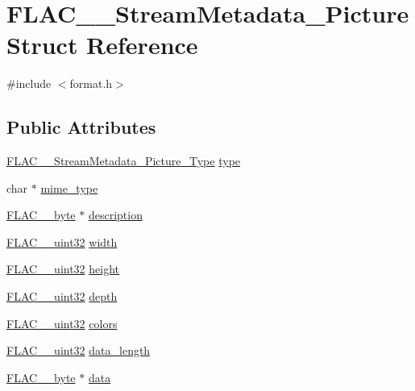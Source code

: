 \hypertarget{struct_f_l_a_c_____stream_metadata___picture}{}\section{F\+L\+A\+C\+\_\+\+\_\+\+Stream\+Metadata\+\_\+\+Picture Struct Reference}
\label{struct_f_l_a_c_____stream_metadata___picture}


{\ttfamily \#include $<$format.\+h$>$}

\subsection*{Public Attributes}
\begin{DoxyCompactItemize}
\item 
\hyperlink{group__flac__format_gaf6d3e836cee023e0b8d897f1fdc9825d}{F\+L\+A\+C\+\_\+\+\_\+\+Stream\+Metadata\+\_\+\+Picture\+\_\+\+Type} \hyperlink{struct_f_l_a_c_____stream_metadata___picture_addc05a87a1da1ec7dd2301944ff2819c}{type}
\item 
char $\ast$ \hyperlink{struct_f_l_a_c_____stream_metadata___picture_a9b4af2e10b627c0e79abf4cdd79f80e0}{mime\+\_\+type}
\item 
\hyperlink{ordinals_8h_a5eb569b12d5b047cdacada4d57924ee3}{F\+L\+A\+C\+\_\+\+\_\+byte} $\ast$ \hyperlink{struct_f_l_a_c_____stream_metadata___picture_a5bbfb168b265edfb0b29cfdb71fb413c}{description}
\item 
\hyperlink{ordinals_8h_a9c4005ea7ef8d564b0cc993cdd0e4e5e}{F\+L\+A\+C\+\_\+\+\_\+uint32} \hyperlink{struct_f_l_a_c_____stream_metadata___picture_a18dc6cdef9fa6c815450671f631a1e04}{width}
\item 
\hyperlink{ordinals_8h_a9c4005ea7ef8d564b0cc993cdd0e4e5e}{F\+L\+A\+C\+\_\+\+\_\+uint32} \hyperlink{struct_f_l_a_c_____stream_metadata___picture_a76dbd1212d330807cda289660f5ee754}{height}
\item 
\hyperlink{ordinals_8h_a9c4005ea7ef8d564b0cc993cdd0e4e5e}{F\+L\+A\+C\+\_\+\+\_\+uint32} \hyperlink{struct_f_l_a_c_____stream_metadata___picture_a0f2092ddf28a6803e9c8adb7328c1967}{depth}
\item 
\hyperlink{ordinals_8h_a9c4005ea7ef8d564b0cc993cdd0e4e5e}{F\+L\+A\+C\+\_\+\+\_\+uint32} \hyperlink{struct_f_l_a_c_____stream_metadata___picture_af17c1738bab67eba049ee101acfd36f0}{colors}
\item 
\hyperlink{ordinals_8h_a9c4005ea7ef8d564b0cc993cdd0e4e5e}{F\+L\+A\+C\+\_\+\+\_\+uint32} \hyperlink{struct_f_l_a_c_____stream_metadata___picture_acb893f63a196f70263468770a90580a4}{data\+\_\+length}
\item 
\hyperlink{ordinals_8h_a5eb569b12d5b047cdacada4d57924ee3}{F\+L\+A\+C\+\_\+\+\_\+byte} $\ast$ \hyperlink{struct_f_l_a_c_____stream_metadata___picture_a9c71b5d77920e6d3aee6893795c43605}{data}
\end{DoxyCompactItemize}



